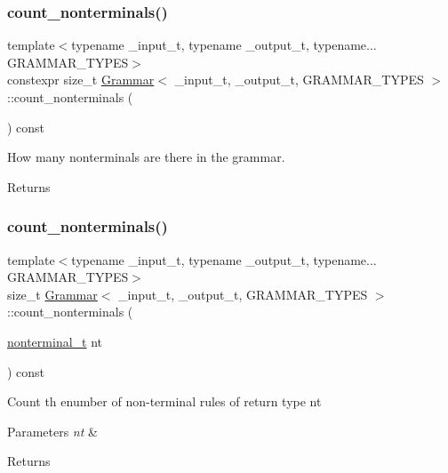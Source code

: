 \subsubsection{\texorpdfstring{count\+\_\+nonterminals()}{count\_nonterminals()}\hspace{0.1cm}{\footnotesize\ttfamily [1/2]}}
{\footnotesize\ttfamily template$<$typename \+\_\+input\+\_\+t, typename \+\_\+output\+\_\+t, typename... G\+R\+A\+M\+M\+A\+R\+\_\+\+T\+Y\+P\+ES$>$ \\
constexpr size\+\_\+t \hyperlink{class_grammar}{Grammar}$<$ \+\_\+input\+\_\+t, \+\_\+output\+\_\+t, G\+R\+A\+M\+M\+A\+R\+\_\+\+T\+Y\+P\+ES $>$\+::count\+\_\+nonterminals (\begin{DoxyParamCaption}{ }\end{DoxyParamCaption}) const\hspace{0.3cm}{\ttfamily [inline]}}

How many nonterminals are there in the grammar. \begin{DoxyReturn}{Returns}

\end{DoxyReturn}
\mbox{\label{class_grammar_acf1de192a73f1c07c44375eb9e08d309}} 
\subsubsection{\texorpdfstring{count\+\_\+nonterminals()}{count\_nonterminals()}\hspace{0.1cm}{\footnotesize\ttfamily [2/2]}}
{\footnotesize\ttfamily template$<$typename \+\_\+input\+\_\+t, typename \+\_\+output\+\_\+t, typename... G\+R\+A\+M\+M\+A\+R\+\_\+\+T\+Y\+P\+ES$>$ \\
size\+\_\+t \hyperlink{class_grammar}{Grammar}$<$ \+\_\+input\+\_\+t, \+\_\+output\+\_\+t, G\+R\+A\+M\+M\+A\+R\+\_\+\+T\+Y\+P\+ES $>$\+::count\+\_\+nonterminals (\begin{DoxyParamCaption}\item[{\hyperlink{_nonterminal_8h_a1c5bfe9b903f69c83bbde5da7035fef3}{nonterminal\+\_\+t}}]{nt }\end{DoxyParamCaption}) const\hspace{0.3cm}{\ttfamily [inline]}}

Count th enumber of non-\/terminal rules of return type nt 
\begin{DoxyParams}{Parameters}
{\em nt} & \\
\hline
\end{DoxyParams}
\begin{DoxyReturn}{Returns}

\end{DoxyReturn}
\mbox{\label{class_grammar_acb0ad7c8f130df2dd73bb5040bdf0fa2}} 
